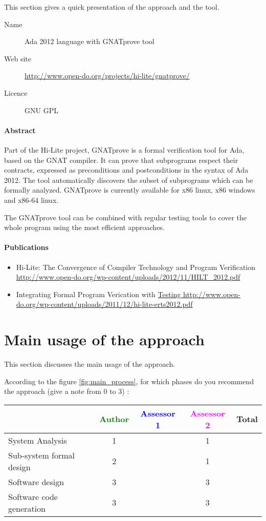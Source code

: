 This section gives a quick presentation of the approach and the tool.

\begin{description}
\item[Name] Ada 2012 language with GNATprove tool
\item[Web site] \url{http://www.open-do.org/projects/hi-lite/gnatprove/}
\item[Licence] GNU GPL
\end{description}

\paragraph{Abstract} Part of the Hi-Lite project, GNATprove is a
formal verification tool for Ada, based on the GNAT compiler. It can
prove that subprograms respect their contracts, expressed as
preconditions and postconditions in the syntax of Ada 2012. The tool
automatically discovers the subset of subprograms which can be
formally analyzed. GNATprove is currently available for x86 linux, x86
windows and x86-64 linux.

The GNATprove tool can be combined with regular testing tools to cover
the whole program using the most efficient approaches.


\paragraph{Publications}
\begin{itemize}
\item Hi-Lite: The Convergence of Compiler Technology and Program
  Verification
  \url{http://www.open-do.org/wp-content/uploads/2012/11/HILT_2012.pdf} 
\item Integrating Formal Program Verication with \url{Testing
  http://www.open-do.org/wp-content/uploads/2011/12/hi-lite-erts2012.pdf}
\end{itemize}



\section{Main usage of the approach}
\label{main_usage}
This section discusses the main usage of the approach.

According to the figure \ref{fig:main_process}, for which phases do you recommend the approach (give a note from 0 to  3) :

\begin{tabular}{|l | c | c | c | c|}
\hline
& \textcolor{green}{Author} & \textcolor{blue}{Assessor 1} & \textcolor{magenta}{Assessor 2} & Total \\
\hline 
System Analysis & 1    & & 1    &  \\
\hline
Sub-system formal design & 2    & & 1    & \\
\hline
Software design & 3    & & 3    & \\
\hline
Software code generation & 3    & & 3    & \\
\hline
\end{tabular}

